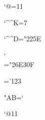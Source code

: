 
\catcode`@=11

\catcode`\^^K=7

\mathcode`\^^D="225E

\delcode`\\="26E30F

='123

\lccode"AB=`\a


\catcode`@11

